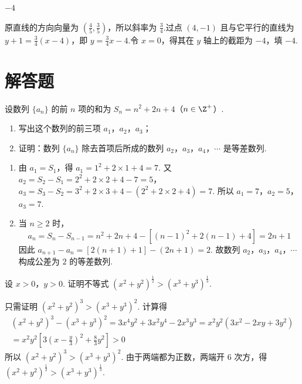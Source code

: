 \documentclass[UTF8,a4paper,oneside,11pt]{ctexbook}
\begin{document}
\begin{answer}
\(-4\)
\end{answer}

\begin{solution}
原直线的方向向量为 \(\left(\frac{4}{5},\frac{3}{5}\right)\)，所以斜率为 \(\frac{3}{4}\).过点 \((4,-1)\) 且与它平行的直线为
\(y+1=\frac{3}{4}(x-4)\)，即 \(y=\frac{3}{4}x-4\).令 \(x=0\)，得其在 \(y\) 轴上的截距为 \(-4\)，填 \(-4\).
\end{solution}

\section{解答题}

\begin{problem}

设数列 \(\{a_n\}\) 的前 \(n\) 项的和为 \(S_n=n^2+2n+4\)（\(n\in\Z^+\)）.

\begin{enumerate}
\item 写出这个数列的前三项 \(a_1\)，\(a_2\)，\(a_3\)；
\item 证明：数列 \(\{a_n\}\) 除去首项后所成的数列 \(a_2\)，\(a_3\)，\(a_4\)，\(\cdots\) 是等差数列.
\end{enumerate}
\end{problem}

\begin{solution}
\begin{enumerate}
\item 由 \(a_1=S_1\)，得 \(a_1=1^2+2\times 1+4=7\).
又 \(a_2=S_2-S_1=2^2+2\times 2+4-7=5\)，\(a_3=S_3-S_2=3^2+2\times 3+4-\left( 2^2+2\times 2+4 \right)=7\).
所以 \(a_1=7\)，\(a_2=5\)，\(a_3=7\).

\item 当 \(n\geqslant 2\) 时，
\[
a_n=S_n-S_{n-1}=n^2+2n+4-\left[ \left( n-1 \right)^2+2\left( n-1 \right)+4 \right]=2n+1
\]
因此 \(a_{n+1}-a_n=\left[ 2\left( n+1 \right)+1 \right]-\left( 2n+1 \right)=2\).
故数列 \(a_2\)，\(a_3\)，\(a_4\)，\(\cdots\) 构成公差为 \(2\) 的等差数列.
\end{enumerate}
\end{solution}

\begin{problem}

设 \(x>0\)，\(y>0\). 证明不等式 \(\left( x^2+y^2 \right)^{\frac{1}{2}}>\left( x^3+y^3 \right)^{\frac{1}{3}}\).
\end{problem}

\begin{solution}
只需证明 \(\left( x^2+y^2 \right)^3>\left( x^3+y^3 \right)^2\). 计算得
\[
\begin{gathered}
\left( x^2+y^2 \right)^3-\left( x^3+y^3 \right)^2
 =3x^4y^2+3x^2y^4-2x^3y^3
 =x^2y^2\left( 3x^2-2xy+3y^2 \right)\\
 =x^2y^2\left[ 3\left( x-\frac{y}{3} \right)^2+\frac{8}{3}y^2 \right]>0
\end{gathered}
\]
所以 \(\left( x^2+y^2 \right)^3>\left( x^3+y^3 \right)^2\). 由于两端都为正数，两端开 \(6\) 次方，得 \(\left( x^2+y^2 \right)^{\frac{1}{2}}>\left( x^3+y^3 \right)^{\frac{1}{3}}\).
\end{solution}
\end{document}
